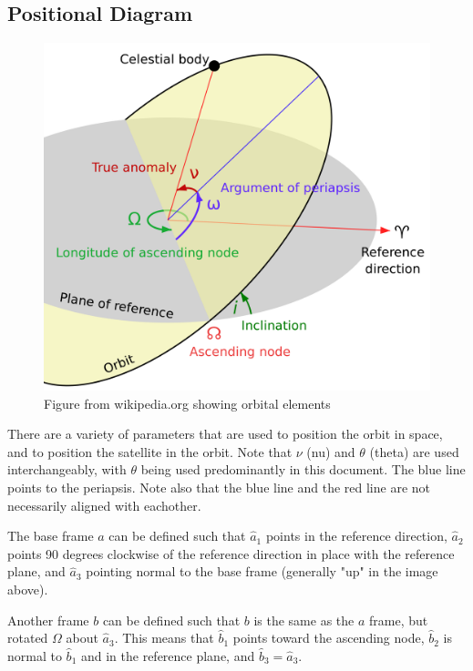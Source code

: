 \documentclass{article}
\begin{document}
\subsection{Positional Diagram}
\begin{figure}[H]
    \centering
    \includegraphics[scale=0.1]{WikiImage}
    \caption{Figure from wikipedia.org showing orbital elements}\label{fig:Wiki Image}
\end{figure}
There are a variety of parameters that are used to position the orbit in space, and to position the satellite in the orbit. Note that $\nu$ (nu) and $\theta$ (theta) are used interchangeably, with $\theta$ being used predominantly in this document. The blue line points to the periapsis. Note also that the blue line and the red line are not necessarily aligned with eachother.

The base frame $a$ can be defined such that $\hat{a}_1$ points in the reference direction, $\hat{a}_2$ points 90 degrees clockwise of the reference direction in place with the reference plane, and $\hat{a}_3$ pointing normal to the base frame (generally "up" in the image above).

Another frame $b$ can be defined such that $b$ is the same as the $a$ frame, but rotated $\Omega$ about $\hat{a}_3$. This means that $\hat{b}_1$ points toward the ascending node, $\hat{b}_2$ is normal to $\hat{b}_1$ and in the reference plane, and $\hat{b}_3=\hat{a}_3$.
\end{document}
